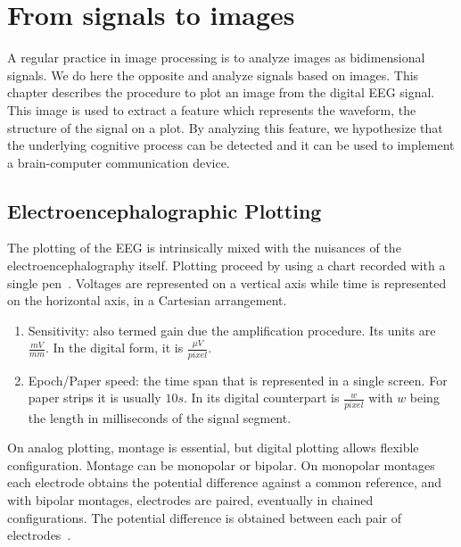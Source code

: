 \chapter{From signals to images}
\label{chapter:two}


A regular practice in image processing is to analyze images as bidimensional signals.  We do here the opposite and analyze signals based on images.
This chapter describes the procedure to plot an image from the digital EEG signal.  This image is used to extract a feature which represents the waveform, the structure of the signal on a plot.  By analyzing this feature, we hypothesize that the underlying cognitive process can be detected and it can be used to implement a brain-computer communication device.

\section{Electroencephalographic Plotting}

The plotting of the EEG is intrinsically mixed with the nuisances of the electroencephalography itself.  Plotting proceed by using a chart recorded with a single pen~\cite{Jestico1977}.   Voltages are represented on a vertical axis while time is represented on the horizontal axis, in a Cartesian arrangement. 

\begin{enumerate}
\item Sensitivity: also termed gain due the amplification procedure.  Its units are $ \frac{mV}{mm}$.  In the digital form, it is $\frac{\mu V}{pixel}$.
\item Epoch/Paper speed: the time span that is represented in a single screen.  For paper strips it is usually $10s$.  In its digital counterpart is $ \frac{w}{pixel}$ with $w$ being the length in milliseconds of the signal segment.
\end{enumerate}

On analog plotting, montage is essential, but digital plotting allows flexible configuration.  Montage can be monopolar or bipolar.  On monopolar montages each electrode obtains the potential difference against a common reference, and with bipolar montages, electrodes are paired, eventually in chained configurations. The potential difference is obtained between each pair of electrodes~\cite{EEGIntro}.


